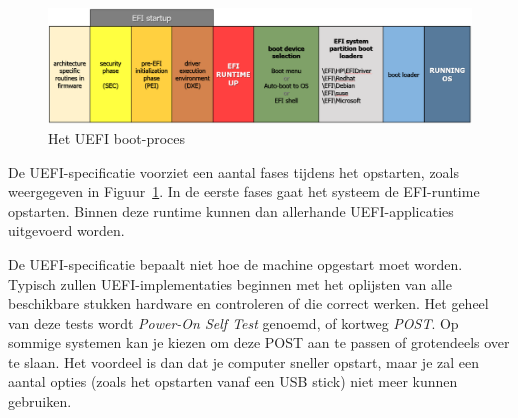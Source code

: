 
\begin{figure}
\centering
\includegraphics[scale=.25]{images/uefisartup.png}
\caption{Het UEFI boot-proces}
\label{uefiboot}
\end{figure}

De UEFI-specificatie voorziet een aantal fases tijdens het opstarten, zoals weergegeven in Figuur~\ref{uefiboot}.
In de eerste fases gaat het systeem de EFI-runtime opstarten. Binnen deze runtime kunnen dan allerhande
UEFI-applicaties uitgevoerd worden.

De UEFI-specificatie bepaalt niet hoe de machine opgestart moet worden. Typisch zullen UEFI-implementaties beginnen met
het oplijsten van alle beschikbare stukken hardware en controleren of die correct werken. Het geheel van deze tests
wordt \emph{Power-On Self Test} genoemd, of kortweg \emph{POST}. Op sommige systemen kan je kiezen om deze POST
aan te passen of grotendeels over te slaan. Het voordeel is dan dat je computer sneller opstart, maar je zal een aantal
opties (zoals het opstarten vanaf een USB stick) niet meer kunnen gebruiken.


